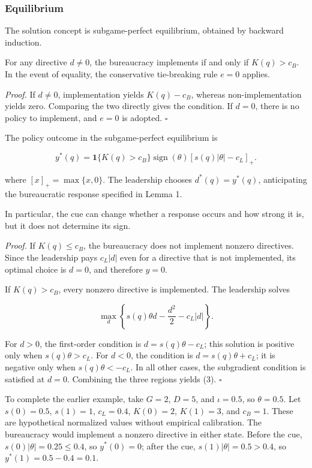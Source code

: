 \documentclass[referee,pdflatex,sn-basic]{sn-jnl}
\theoremstyle{thmstylethree}
\begin{document}
\subsubsection{Equilibrium}\label{equilibrium}

The solution concept is subgame-perfect equilibrium, obtained by backward induction.

For any directive $d\neq0$, the bureaucracy implements if and only if $K(q)>c_B$. In the event of equality, the conservative tie-breaking rule $e=0$ applies.
\endmodellemma

\textit{Proof.} If \(d\neq0\), implementation yields \(K(q)-c_B\), whereas non-implementation yields zero. Comparing the two directly gives the condition. If \(d=0\), there is no policy to implement, and \(e=0\) is adopted. \(\square\)

The policy outcome in the subgame-perfect equilibrium is

\[
y^*(q)=
\mathbf{1}\{K(q)>c_B\}
\operatorname{sign}(\theta)
\left[s(q)|\theta|-c_L\right]_{+}.
\tag{3}
\]

where $\left[x\right]_{+}=\max\{x,0\}$. The leadership chooses $d^*(q)=y^*(q)$, anticipating the bureaucratic response specified in Lemma 1.

In particular, the cue can change whether a response occurs and how strong it is, but it does not determine its sign.
\endmodelproposition

\textit{Proof.} If \(K(q)\leq c_B\), the bureaucracy does not implement nonzero directives. Since the leadership pays \(c_L|d|\) even for a directive that is not implemented, its optimal choice is \(d=0\), and therefore \(y=0\).

\begin{minipage}{\linewidth}
If $K(q)>c_B$, every nonzero directive is implemented. The leadership solves

\[
\max_d\left\{s(q)\theta d-\frac{d^2}{2}-c_L|d|\right\}.
\]
\end{minipage}

For \(d>0\), the first-order condition is \(d=s(q)\theta-c_L\); this solution is positive only when \(s(q)\theta>c_L\). For \(d<0\), the condition is \(d=s(q)\theta+c_L\); it is negative only when \(s(q)\theta<-c_L\). In all other cases, the subgradient condition is satisfied at \(d=0\). Combining the three regions yields (3). \(\square\)

To complete the earlier example, take \(G=2\), \(D=5\), and \(\iota=0.5\), so \(\theta=0.5\). Let \(s(0)=0.5\), \(s(1)=1\), \(c_L=0.4\), \(K(0)=2\), \(K(1)=3\), and \(c_B=1\). These are hypothetical normalized values without empirical calibration. The bureaucracy would implement a nonzero directive in either state. Before the cue, \(s(0)|\theta|=0.25\leq0.4\), so \(y^*(0)=0\); after the cue, \(s(1)|\theta|=0.5>0.4\), so \(y^*(1)=0.5-0.4=0.1\).
\end{document}
